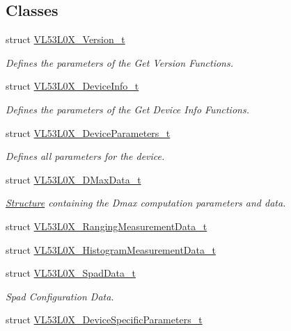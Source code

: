 \subsection*{Classes}
\begin{DoxyCompactItemize}
\item 
struct \hyperlink{structVL53L0X__Version__t}{V\+L53\+L0\+X\+\_\+\+Version\+\_\+t}
\begin{DoxyCompactList}\small\item\em Defines the parameters of the Get Version Functions. \end{DoxyCompactList}\item 
struct \hyperlink{structVL53L0X__DeviceInfo__t}{V\+L53\+L0\+X\+\_\+\+Device\+Info\+\_\+t}
\begin{DoxyCompactList}\small\item\em Defines the parameters of the Get Device Info Functions. \end{DoxyCompactList}\item 
struct \hyperlink{structVL53L0X__DeviceParameters__t}{V\+L53\+L0\+X\+\_\+\+Device\+Parameters\+\_\+t}
\begin{DoxyCompactList}\small\item\em Defines all parameters for the device. \end{DoxyCompactList}\item 
struct \hyperlink{structVL53L0X__DMaxData__t}{V\+L53\+L0\+X\+\_\+\+D\+Max\+Data\+\_\+t}
\begin{DoxyCompactList}\small\item\em \hyperlink{structStructure}{Structure} containing the Dmax computation parameters and data. \end{DoxyCompactList}\item 
struct \hyperlink{structVL53L0X__RangingMeasurementData__t}{V\+L53\+L0\+X\+\_\+\+Ranging\+Measurement\+Data\+\_\+t}
\item 
struct \hyperlink{structVL53L0X__HistogramMeasurementData__t}{V\+L53\+L0\+X\+\_\+\+Histogram\+Measurement\+Data\+\_\+t}
\item 
struct \hyperlink{structVL53L0X__SpadData__t}{V\+L53\+L0\+X\+\_\+\+Spad\+Data\+\_\+t}
\begin{DoxyCompactList}\small\item\em Spad Configuration Data. \end{DoxyCompactList}\item 
struct \hyperlink{structVL53L0X__DeviceSpecificParameters__t}{V\+L53\+L0\+X\+\_\+\+Device\+Specific\+Parameters\+\_\+t}
\item 

\end{DoxyCompactItemize}
